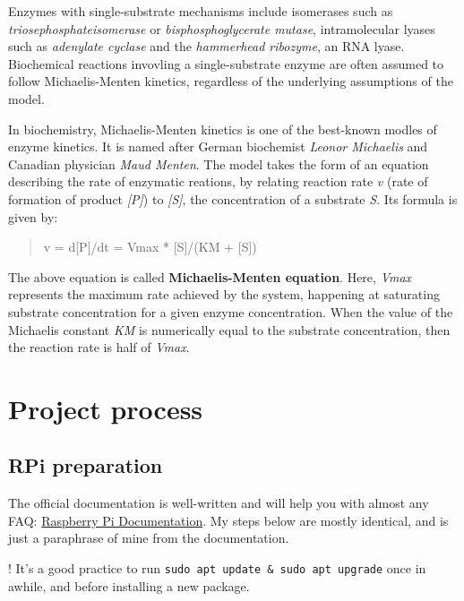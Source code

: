 Enzymes with single-substrate mechanisms include isomerases such as
\emph{triosephosphateisomerase} or \emph{bisphosphoglycerate mutase},
intramolecular lyases such as \emph{adenylate cyclase} and the
\emph{hammerhead ribozyme}, an RNA lyase. Biochemical reactions
invovling a single-substrate enzyme are often assumed to follow
Michaelis-Menten kinetics, regardless of the underlying assumptions of
the model.

In biochemistry, Michaelis-Menten kinetics is one of the best-known
modles of enzyme kinetics. It is named after German biochemist
\emph{Leonor Michaelis} and Canadian physician \emph{Maud Menten}. The
model takes the form of an equation describing the rate of enzymatic
reations, by relating reaction rate \emph{v} (rate of formation of
product \emph{{[}P{]}}) to \emph{{[}S{]}}, the concentration of a
substrate \emph{S}. Its formula is given by:

\begin{quote}
v = d{[}P{]}/dt = Vmax * {[}S{]}/(KM + {[}S{]})
\end{quote}

The above equation is called \textbf{Michaelis-Menten equation}. Here,
\emph{Vmax} represents the maximum rate achieved by the system,
happening at saturating substrate concentration for a given enzyme
concentration. When the value of the Michaelis constant \emph{KM} is
numerically equal to the substrate concentration, then the reaction rate
is half of \emph{Vmax}.

\newpage

\hypertarget{project-process}{%
\section{Project process}\label{project-process}}

\hypertarget{rpi-preparation}{%
\subsection{RPi preparation}\label{rpi-preparation}}

The official documentation is well-written and will help you with almost
any FAQ: \href{https://www.raspberrypi.com/documentation/}{Raspberry Pi
Documentation}. My steps below are mostly identical, and is just a
paraphrase of mine from the documentation.

! It's a good practice to run
\texttt{sudo\ apt\ update\ \&\ sudo\ apt\ upgrade} once in awhile, and
before installing a new package.

